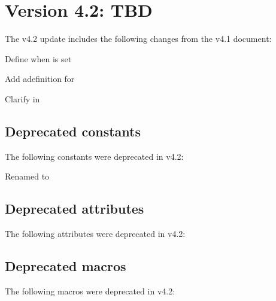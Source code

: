 \section{Version 4.2: TBD}

The v4.2 update includes the following changes from the v4.1 document:

\begin{compactitemize}
    \item Define when  is set
    \item Add adefinition for 
    \item Clarify  in 
\end{compactitemize}

\subsection{Deprecated constants}

The following constants were deprecated in v4.2:

\begin{constantdesc}
%
Renamed to 
%
\end{constantdesc}


\subsection{Deprecated attributes}

The following attributes were deprecated in v4.2:

%

\subsection{Deprecated macros}

The following macros were deprecated in v4.2:

